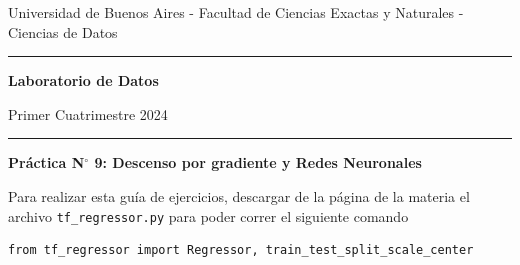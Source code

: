 \documentclass[a4paper,11pt]{article}
\theoremstyle{definition}
\begin{document}
\centerline{{\small Universidad de Buenos Aires - Facultad de Ciencias Exactas y Naturales - Ciencias de Datos}}

\vskip 0.2cm

\hrule

\vskip 0.2cm

 \centerline{{\bf\Large{\sc Laboratorio de Datos}}}

 \vskip 0.2cm

 \centerline{\ttfamily Primer Cuatrimestre 2024}

\vskip 0.2cm

 \hrule

 \bigskip
 \centerline{\bf Práctica N$^\circ$ 9: Descenso por gradiente y Redes Neuronales}
 \bigskip


Para realizar esta guía de ejercicios, descargar de la página de la materia el archivo \verb|tf_regressor.py| para poder correr el siguiente comando
\begin{lstlisting}
from tf_regressor import Regressor, train_test_split_scale_center
\end{lstlisting}
\end{document}
